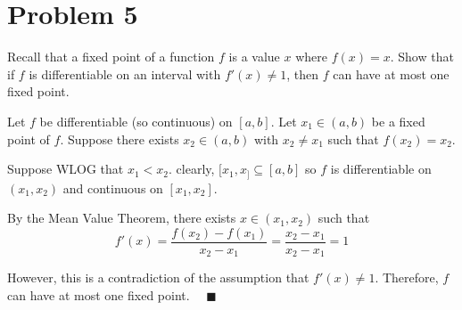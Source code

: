 \documentclass[12pt]{article}
\newcommand{\qed}{\quad \blacksquare}
\begin{document}
\pagebreak
\section{Problem 5}
Recall that a fixed point of a function $f$ is a value $x$ where $f(x)=x$. Show that if $f$ is differentiable on an interval with $f'(x)\neq1$, then $f$ can have at most one fixed point.

    \color{blue}
        Let $f$ be differentiable (so continuous) on $[a, b]$. Let $x_1 \in (a, b)$ be a fixed point of $f$. Suppose there exists $x_2 \in (a, b)$ with $x_2 \neq x_1$ such that $f(x_2) = x_2$. 

        Suppose WLOG that $x_1 < x_2$. clearly, $[x_1, x_] \subseteq [a, b]$ so $f$ is differentiable on $(x_1, x_2)$ and continuous on $[x_1, x_2]$. 
        
        By the Mean Value Theorem, there exists $x \in (x_1, x_2)$ such that
        \[f'(x) = \frac{f(x_2) - f(x_1)}{x_2 - x_1} = \frac{x_2 - x_1}{x_2 - x_1} = 1\]

        However, this is a contradiction of the assumption that $f'(x) \neq 1$. Therefore, $f$ can have at most one fixed point. $\qed$
    \color{black}
\end{document}
